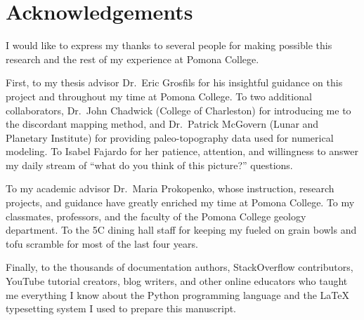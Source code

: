 \chapter*{Acknowledgements}

I would like to express my thanks to several people for making possible this research and the rest of my experience at Pomona College. 

First, to my thesis advisor Dr.\ Eric Grosfils for his insightful guidance on this project and throughout my time at Pomona College. To two additional collaborators, Dr.\ John Chadwick (College of Charleston) for introducing me to the discordant mapping method, and Dr.\ Patrick McGovern (Lunar and Planetary Institute) for providing paleo-topography data used for numerical modeling. To Isabel Fajardo for her patience, attention, and willingness to answer my daily stream of ``what do you think of this picture?'' questions.

To my academic advisor Dr.\ Maria Prokopenko, whose instruction, research projects, and guidance have greatly enriched my time at Pomona College. To my classmates, professors, and the faculty of the Pomona College geology department. To the 5C dining hall staff for keeping my fueled on grain bowls and tofu scramble for most of the last four years.

Finally, to the thousands of documentation authors, StackOverflow contributors, YouTube tutorial creators, blog writers, and other online educators who taught me everything I know about the Python programming language and the \LaTeX{} typesetting system I used to prepare this manuscript.